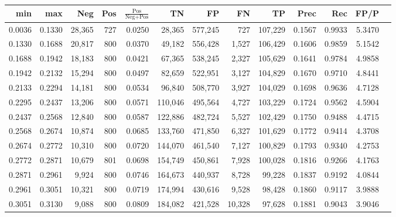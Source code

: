 \begin{tabular}{rrrrrrrrrrrrr}
\toprule
   min &    max &    Neg &   Pos & $\frac{\text{Pos}}{\text{Neg}+\text{Pos}}$ &      TN &      FP &      FN &      TP &   Prec &    Rec &   FP/P \\
\midrule
0.0036 & 0.1330 & 28,365 &   727 &                                     0.0250 &  28,365 & 577,245 &     727 & 107,229 & 0.1567 & 0.9933 & 5.3470 \\
0.1330 & 0.1688 & 20,817 &   800 &                                     0.0370 &  49,182 & 556,428 &   1,527 & 106,429 & 0.1606 & 0.9859 & 5.1542 \\
0.1688 & 0.1942 & 18,183 &   800 &                                     0.0421 &  67,365 & 538,245 &   2,327 & 105,629 & 0.1641 & 0.9784 & 4.9858 \\
0.1942 & 0.2132 & 15,294 &   800 &                                     0.0497 &  82,659 & 522,951 &   3,127 & 104,829 & 0.1670 & 0.9710 & 4.8441 \\
0.2133 & 0.2294 & 14,181 &   800 &                                     0.0534 &  96,840 & 508,770 &   3,927 & 104,029 & 0.1698 & 0.9636 & 4.7128 \\
0.2295 & 0.2437 & 13,206 &   800 &                                     0.0571 & 110,046 & 495,564 &   4,727 & 103,229 & 0.1724 & 0.9562 & 4.5904 \\
0.2437 & 0.2568 & 12,840 &   800 &                                     0.0587 & 122,886 & 482,724 &   5,527 & 102,429 & 0.1750 & 0.9488 & 4.4715 \\
0.2568 & 0.2674 & 10,874 &   800 &                                     0.0685 & 133,760 & 471,850 &   6,327 & 101,629 & 0.1772 & 0.9414 & 4.3708 \\
0.2674 & 0.2772 & 10,310 &   800 &                                     0.0720 & 144,070 & 461,540 &   7,127 & 100,829 & 0.1793 & 0.9340 & 4.2753 \\
0.2772 & 0.2871 & 10,679 &   801 &                                     0.0698 & 154,749 & 450,861 &   7,928 & 100,028 & 0.1816 & 0.9266 & 4.1763 \\
0.2871 & 0.2961 &  9,924 &   800 &                                     0.0746 & 164,673 & 440,937 &   8,728 &  99,228 & 0.1837 & 0.9192 & 4.0844 \\
0.2961 & 0.3051 & 10,321 &   800 &                                     0.0719 & 174,994 & 430,616 &   9,528 &  98,428 & 0.1860 & 0.9117 & 3.9888 \\
0.3051 & 0.3130 &  9,088 &   800 &                                     0.0809 & 184,082 & 421,528 &  10,328 &  97,628 & 0.1881 & 0.9043 & 3.9046 \\

\end{tabular}
